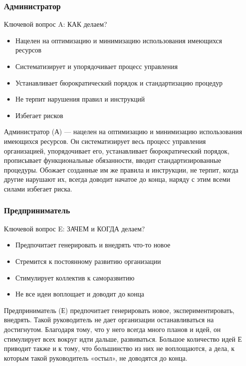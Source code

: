 \documentclass{../industrial-development}
\begin{document}
\begin{frame} \frametitle{Администратор}
	\begin{block}{Ключевой вопрос A:}
		КАК делаем?
	\end{block}	
 \begin{itemize}
	 \item Нацелен на оптимизацию и минимизацию использования имеющихся ресурсов
	 \item Систематизирует и упорядочивает процесс управления
	 \item Устанавливает бюрократический порядок и стандартизацию процедур
	 \item Не терпит нарушения правил и инструкций
	\item Избегает рисков
 \end{itemize}
\end{frame}
\lecturenotes
Администратор (А) — нацелен на оптимизацию и минимизацию использования имеющихся ресурсов. Он систематизирует весь процесс управления организацией, упорядочивает его, устанавливает бюрократический порядок, прописывает функциональные обязанности, вводит стандартизированные процедуры. Обожает созданные им же правила и инструкции, не терпит, когда другие нарушают их, всегда доводит начатое до конца, наряду с этим всеми силами избегает риска.


\begin{frame} \frametitle{Предприниматель}
	\begin{block}{Ключевой вопрос E:}
		ЗАЧЕМ и КОГДА делаем?
	\end{block}	
 \begin{itemize}
	 \item Предпочитает генерировать и внедрять что-то новое
	 \item Стремится к постоянному развитию организации
	 \item Стимулирует коллектив к саморазвитию
	 \item Не все идеи воплощает и доводит до конца
 \end{itemize}
\end{frame}
\lecturenotes
Предприниматель (Е) предпочитает генерировать новое, экспериментировать, внедрять. Такой руководитель не дает организации останавливаться на достигнутом. Благодаря тому, что у него всегда много планов и идей, он стимулирует всех вокруг идти дальше, развиваться. Большое количество идей Е приводит также и к тому, что большинство из них не воплощаются, а дела, к которым такой руководитель «остыл», не доводятся до конца. 
\end{document}
